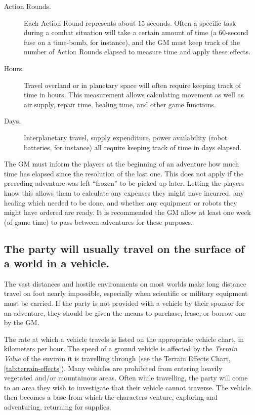 \begin{description}
\item[Action Rounds.] Each Action Round represents about 15 seconds.
  Often a specific task during a combat situation will take a certain
  amount of time (a 60-second fuse on a time-bomb, for instance), and
  the GM must keep track of the number of Action Rounds elapsed to
  measure time and apply these effects.
\item[Hours.] Travel overland or in planetary space will often require
  keeping track of time in hours. This measurement allows calculating
  movement as well as air supply, repair time, healing time, and other
  game functions.
\item[Days.] Interplanetary travel, supply expenditure, power
  availability (robot batteries, for instance) all require keeping
  track of time in days elapsed.
\end{description}

The GM must inform the players at the beginning of an adventure how
much time has elapsed since the resolution of the last one. This does
not apply if the preceding adventure was left ``frozen'' to be picked up
later. Letting the players know this allows them to calculate any
expenses they might have incurred, any healing which needed to be
done, and whether any equipment or robots they might have ordered are
ready. It is recommended the GM allow at least one week (of game
time) to pass between adventures for these purposes.


\subsection[Vehicle Travel]{The party will usually travel on the
  surface of a world in a vehicle.} 
\label{sec:vehicle-travel}



The vast distances and hostile environments on most worlds make long
distance travel on foot nearly impossible, especially when scientific
or military equipment must be carried. If the party is not provided
with a vehicle by their sponsor for an adventure, they should be given
the means to purchase, lease, or borrow one by the GM.

The rate at which a vehicle travels is listed on the appropriate
vehicle chart, in kilometers per hour. The speed of a ground vehicle
is affected by the \emph{Terrain Value} of the environ it is
travelling through (see the Terrain Effects Chart, \ref{tab:terrain-effects}).
Many vehicles are prohibited from entering heavily vegetated and/or
mountainous areas. Often while travelling, the party will come to an
area they wish to investigate that their vehicle cannot traverse. The
vehicle then becomes a base from which the characters venture,
exploring and adventuring, returning for supplies.


